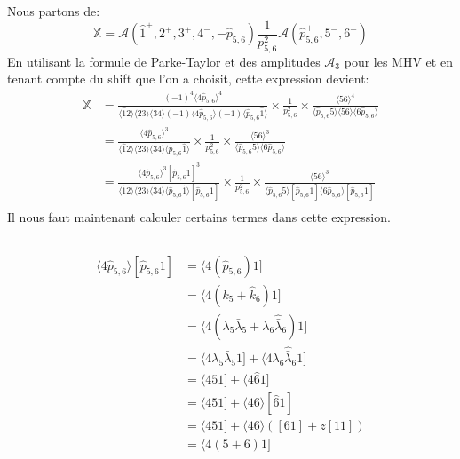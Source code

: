 \documentclass[12pt, a4paper]{article}
\begin{document}
		Nous partons de:
		\[\mathbb{X}=\mathcal{A}(\hat{1}^+, 2^+, 3^+, 4^-, -\hat{p}_{5,6}^-) \frac{1}{p_{5,6}^2} \mathcal{A}(\hat{p}_{5,6}^+, 5^-, 6^-)\]
		En utilisant la formule de Parke-Taylor et des amplitudes $\mathcal{A}_3$ pour les MHV et en tenant compte du shift que l'on a choisit, cette expression devient:
		\begin{equation}
			\begin{split}
				\mathbb{X}
				&=\frac{(-1)^4 \langle 4 \hat{p}_{5,6} \rangle^4}
				{\langle \hat{1}2 \rangle \langle 23 \rangle \langle 34 \rangle 
				(-1) \langle 4 \hat{p}_{5,6} \rangle (-1) \langle \hat{p}_{5,6}\hat{1} \rangle } \times \frac{1}{p_{5,6}^2} \times \frac{\langle 56 \rangle^4}
				{\langle \hat{p}_{5,6} 5 \rangle \langle 56 \rangle 
				\langle 6\hat{p}_{5,6} \rangle}\\
				&=\frac{\langle 4 \hat{p}_{5,6} \rangle^3}
				{\langle \hat{1}2 \rangle \langle 23 \rangle \langle 34 \rangle 
					\langle \hat{p}_{5,6}\hat{1} \rangle } \times \frac{1}{p_{5,6}^2} \times \frac{\langle 56 \rangle^3}
				{\langle \hat{p}_{5,6} 5 \rangle 
					\langle 6\hat{p}_{5,6} \rangle}\\
				&=\frac{\langle 4 \hat{p}_{5,6} \rangle^3 [\hat{p}_{5,6}1]^3}
				{\langle \hat{1}2 \rangle \langle 23 \rangle \langle 34 \rangle 
					\langle \hat{p}_{5,6}\hat{1} \rangle [\hat{p}_{5,6}1] } \times \frac{1}{p_{5,6}^2} \times \frac{\langle 56 \rangle^3}
				{\langle \hat{p}_{5,6} 5 \rangle[\hat{p}_{5,6}1] 
					\langle 6\hat{p}_{5,6} \rangle[\hat{p}_{5,6}1]}\\
			\end{split}
		\end{equation}
		Il nous faut maintenant calculer certains termes dans cette expression.
		\subsection{}
		\begin{equation}
			\begin{split}
				\langle 4 \hat{p}_{5,6} \rangle [\hat{p}_{5,6}1]
				&=\langle 4(\hat{p}_{5,6})1]\\
				&=\langle 4 (k_5 +\hat{k}_6)1 ]\\
				&=\langle 4 (\lambda_5\bar{\lambda}_5 + \lambda_6 \hat{\bar{\lambda}}_6)1]\\
				&=\langle 4 \lambda_5\bar{\lambda}_5 1] + \langle 4 \lambda_6\hat{\bar{\lambda}}_6 1]\\
				&=\langle 451] +\langle 4\hat{6}1] \\
				&=\langle 451] +\langle 46 \rangle [\hat{6}1] \\
				&=\langle 451] +\langle 46 \rangle ([61]+z[11]) \\
				&=\langle 4(5+6)1]
			\end{split}
		\end{equation}
		
\end{document}
